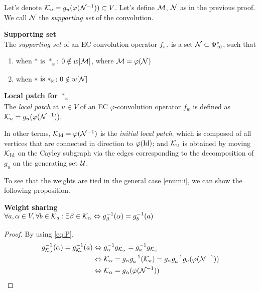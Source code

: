 
Let's denote $\mathcal{K}_u = g_u(\varphi(\mathcal{N}^{-1})) \subset V$.
Let's define $\mathcal{M}$, $\mathcal{N}$ as in the previous proof. We call $\mathcal{N}$ the \emph{supporting set} of the convolution.

\begin{definition}\textbf{Supporting set}\\
The \emph{supporting set} of an EC convolution operator $f_w$, is a set $\mathcal{N} \subset \Phi^*_{\operatorname{\textsc{ec}}}$, such that
\begin{enumerate}[label=(\roman*)]
  \item when $\ast \text{ is } \ast_\varphi$: $0 \notin w[\mathcal{M}]$, where $\mathcal{M}= \varphi(\mathcal{N})$ \label{enum:i}
  \item when $\ast \text{ is } \ast_{\operatorname{\textsc{m}}}$: $0 \notin w[\mathcal{N}]$ \label{enum:ii}
\end{enumerate}
\end{definition}

\begin{definition}\textbf{Local patch for $\ast_\varphi$}\\
The \emph{local patch} at $u \in V$ of an EC $\varphi$-convolution operator $f_w$ is defined as $\mathcal{K}_u = g_u(\varphi(\mathcal{N}^{-1}))$.
\end{definition}

\begin{remark}
In other terms, $\mathcal{K}_{\operatorname{Id}} = \varphi(\mathcal{N}^{-1})$ is the \emph{initial local patch}, which is composed of all vertices that are connected in direction to $\varphi(\operatorname{Id})$; and $\mathcal{K}_u$ is obtained by moving $\mathcal{K}_{\operatorname{Id}} $ on the Cayley subgraph via the edges corresponding to the decomposition of $g_u$ on the generating set $\mathcal{U}$.
\end{remark}

To see that the weights are tied in the general case \ref{enum:i}, we can show the following proposition.

\begin{proposition}\textbf{Weight sharing}\\
$\forall a, \alpha \in V, \forall b \in \mathcal{K}_a: \exists \beta \in \mathcal{K}_{\alpha} \Leftrightarrow g_{\beta}^{-1}(\alpha) = g_{b}^{-1}(a)$
\end{proposition}
\begin{proof}
By using \eqref{eq:P},
\begin{align*}
g_{\mathcal{K}_\alpha}^{-1}(\alpha) = g_{\mathcal{K}_a}^{-1}(a)
	& \Leftrightarrow  g_{\alpha}^{-1}g_{\mathcal{K}_{\alpha}} = g_a^{-1}g_{\mathcal{K}_a}\\
	& \Leftrightarrow  \mathcal{K}_{\alpha} = g_{\alpha}g_a^{-1}(\mathcal{K}_a) = g_{\alpha}g_a^{-1}g_a(\varphi(\mathcal{N}^{-1}))\\
	& \Leftrightarrow  \mathcal{K}_{\alpha} = g_{\alpha}(\varphi(\mathcal{N}^{-1}))
\end{align*}
\end{proof}

